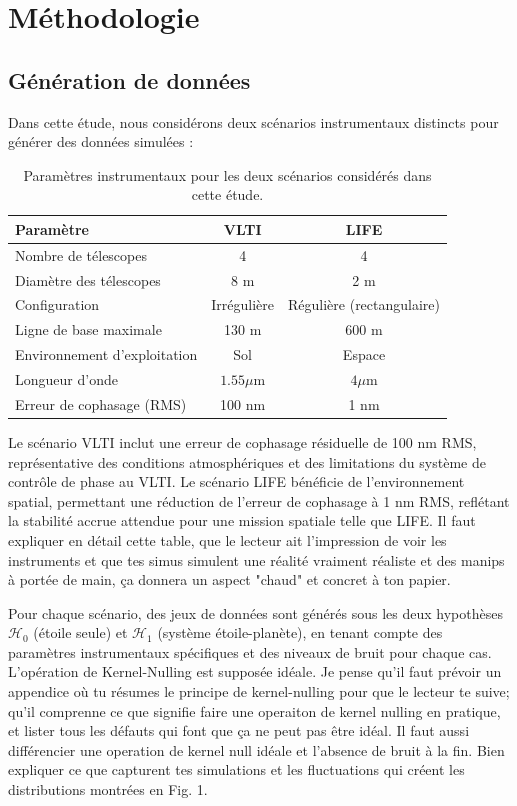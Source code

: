 \documentclass{article}
\newcommand{\dm}[1]{{\color{mulberry} #1}}
\begin{document}

\section{Méthodologie}

\subsection{Génération de données}

Dans cette étude, nous considérons deux scénarios instrumentaux distincts pour générer des données simulées :

\begin{table}[H]
\centering
\begin{tabular}{|l|c|c|}
\hline
\textbf{Paramètre} & \textbf{VLTI} & \textbf{LIFE} \\
\hline
Nombre de télescopes & 4 & 4 \\
Diamètre des télescopes & 8 m & 2 m \\
Configuration & Irrégulière & Régulière (rectangulaire) \\
Ligne de base maximale & 130 m & 600 m \\
Environnement d'exploitation & Sol & Espace \\
Longueur d'onde & $1.55\mu$m & $4\mu$m \\
Erreur de cophasage (RMS) & 100 nm & 1 nm \\
\hline
\end{tabular}
\caption{Paramètres instrumentaux pour les deux scénarios considérés dans cette étude.}
\label{tab:scenarios}
\end{table}

Le scénario VLTI inclut une erreur de cophasage résiduelle de 100 nm RMS, représentative des conditions atmosphériques et des limitations du système de contrôle de phase au VLTI. Le scénario LIFE bénéficie de l'environnement spatial, permettant une réduction de l'erreur de cophasage à 1 nm RMS, reflétant la stabilité accrue attendue pour une mission spatiale telle que LIFE.\dm{Il faut expliquer en détail cette table, que le lecteur ait l'impression de voir les instruments et que tes simus simulent une réalité vraiment réaliste et des manips à portée de main, ça donnera un aspect "chaud" et concret à ton papier.}

Pour chaque scénario, des jeux de données sont générés sous les deux hypothèses $\mathcal{H}_0$ (étoile seule) et $\mathcal{H}_1$ (système étoile-planète), en tenant compte des paramètres instrumentaux spécifiques et des niveaux de bruit pour chaque cas. L'opération de Kernel-Nulling est supposée idéale.\dm{Je pense qu'il faut prévoir un appendice où tu résumes le principe de kernel-nulling pour que le lecteur te suive; qu'il comprenne ce que signifie faire une operaiton de kernel nulling en pratique, et lister tous les défauts qui font que ça ne peut pas être idéal. Il faut aussi différencier une operation de kernel null idéale et l'absence de bruit à la fin. Bien expliquer ce que capturent tes simulations et les fluctuations qui créent les distributions montrées en Fig. 1.}
\end{document}
